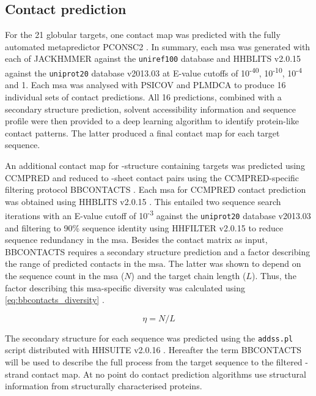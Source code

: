 \subsection{Contact prediction}
For the 21 globular targets, one contact map was predicted with the fully automated metapredictor PCONSC2 \cite{Skwark2014-qp}. In summary, each \gls{msa} was generated with each of JACKHMMER  \cite{Johnson2010-uz} against the \texttt{uniref100} database and HHBLITS v2.0.15 \cite{Remmert2011-kt} against the \texttt{uniprot20} database v2013.03 \cite{Bateman2017-pb} at E-value cutoffs of 10\textsuperscript{-40}, 10\textsuperscript{-10}, 10\textsuperscript{-4} and 1. Each \gls{msa} was analysed with PSICOV \cite{Jones2012-ks} and PLMDCA \cite{Ekeberg2014-kf} to produce 16 individual sets of contact predictions. All 16 predictions, combined with a secondary structure prediction, solvent accessibility information and sequence profile were then provided to a deep learning algorithm \cite{Skwark2014-qp} to identify protein-like contact patterns. The latter produced a final contact map for each target sequence. 

An additional contact map for \textbeta-structure containing targets was predicted using CCMPRED \cite{Seemayer2014-zp} and reduced to \textbeta-sheet contact pairs using the CCMPRED-specific filtering protocol BBCONTACTS \cite{Andreani2015-qn}. Each \gls{msa} for CCMPRED contact prediction was obtained using HHBLITS v2.0.15 \cite{Remmert2011-kt}. This entailed two sequence search iterations with an E-value cutoff of 10\textsuperscript{-3} against the \texttt{uniprot20} database v2013.03 \cite{Bateman2017-pb} and filtering to 90\% sequence identity using HHFILTER v2.0.15 \cite{Remmert2011-kt} to reduce sequence redundancy in the \gls{msa}. Besides the contact matrix as input, BBCONTACTS requires a secondary structure prediction and a factor describing the range of predicted contacts in the \gls{msa}. The latter was shown to depend on the sequence count in the \gls{msa} ($N$) and the target chain length ($L$). Thus, the factor describing this \gls{msa}-specific diversity was calculated using \cref{eq:bbcontacts_diversity} \cite{Andreani2015-qn}. 

\begin{equation}
    \eta=N/L 
    \label{eq:bbcontacts_diversity}
\end{equation}

The secondary structure for each sequence was predicted using the \texttt{addss.pl} \cite{Remmert2011-kt} script distributed with HHSUITE v2.0.16 \cite{Soding2005-hw}. Hereafter the term BBCONTACTS will be used to describe the full process from the target sequence to the filtered \textbeta-strand contact map. At no point do contact prediction algorithms use structural information from structurally characterised proteins.

